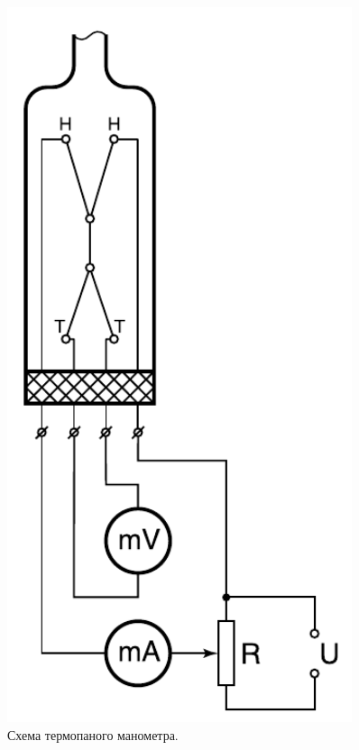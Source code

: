 \documentclass{article}
\begin{document}
    \begin{figure}[h]
    \centering
    \begin{minipage}{0.3\textwidth}
        \centering
        \includegraphics[width=0.9\textwidth]{termoparni_monometr}
        \caption{Схема термопаного манометра.}
        \label{ris:termoparni_monometr}
    \end{minipage}\hfill
    \begin{minipage}{0.7\textwidth}

\end{minipage}
\end{figure}
\end{document}

